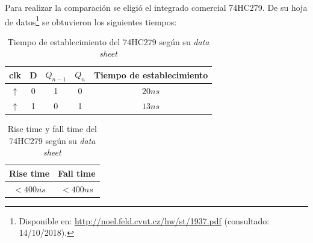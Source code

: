 \documentclass[../../e3_tp2_main.tex]{subfiles}
\begin{document}
Para realizar la comparación se eligió el integrado comercial 74HC279. De su hoja de datos\footnote{Disponible en: \url{http://noel.feld.cvut.cz/hw/st/1937.pdf} (consultado: 14/10/2018).} se obtuvieron los siguientes tiempos:

\begin{table}[H]
\begin{center}
\begin{tabular}{|c|c|c|c|c|}
\hline
clk& D & $Q_{n-1}$ & $Q_n$ &Tiempo de establecimiento\\
\hline \hline
$\uparrow$ &0& 1&0&$20n s$  \\ \hline
$\uparrow$ &1&0&1&$13 n s$  \\ \hline
\end{tabular}
\caption{Tiempo de establecimiento del 74HC279 seg\'un su \textit{data sheet}} 
\end{center}
\end{table}

\begin{table}[H]
\begin{center}
\begin{tabular}{|c|c|}
\hline
Rise time& Fall time \\
\hline \hline
$<400 n s$  & $<400 n s$ \\ \hline
\end{tabular}
\caption{Rise time y fall time del 74HC279 seg\'un su \textit{data sheet}} 
\end{center}
\end{table}
\end{document}
